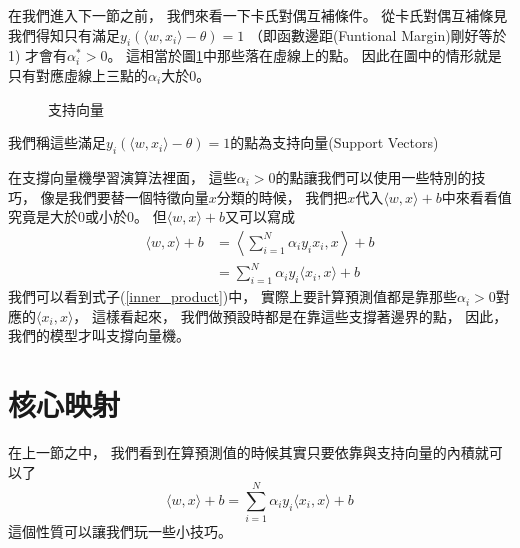   在我們進入下一節之前，
  我們來看一下卡氏對偶互補條件。
  從卡氏對偶互補條見我們得知只有滿足$y_i ( \langle w, x_i \rangle - \theta) = 1$
  （即函數邊距(Funtional Margin)剛好等於1)
  才會有$\alpha_i^{*} > 0$。
  這相當於圖\ref{fig:support_vectors}中那些落在虛線上的點。
  因此在圖中的情形就是只有對應虛線上三點的$\alpha_i$大於0。
  \begin{figure}
    \begin{center}
    \end{center}
    \caption{支持向量}
    \label{fig:support_vectors}
  \end{figure}
  我們稱這些滿足$y_i ( \langle w, x_i \rangle - \theta) = 1$的點為支持向量(Support Vectors)

  在支撐向量機學習演算法裡面，
  這些$\alpha_i > 0$的點讓我們可以使用一些特別的技巧，
  像是我們要替一個特徵向量$x$分類的時候，
  我們把$x$代入$\langle w, x \rangle + b$中來看看值究竟是大於0或小於0。
  但$\langle w, x \rangle + b$又可以寫成
  \begin{equation}
    \begin{split}
      \langle w, x \rangle + b 
      &= \left\langle \sum_{i=1}^N \alpha_i y_i x_i, x \right\rangle + b \\
      &= \sum_{i=1}^N \alpha_i y_i \langle x_i, x \rangle + b \label{inner_product}
    \end{split}
  \end{equation}
  我們可以看到式子(\ref{inner_product})中，
  實際上要計算預測值都是靠那些$\alpha_i > 0$對應的$\langle x_i, x \rangle$，
  這樣看起來，
  我們做預設時都是在靠這些支撐著邊界的點，
  因此，
  我們的模型才叫支撐向量機。
  
\section{核心映射}
  在上一節之中，
  我們看到在算預測值的時候其實只要依靠與支持向量的內積就可以了
  \begin{equation}
    \langle w, x \rangle + b = \sum_{i=1}^N \alpha_i y_i \langle x_i, x \rangle + b \label{inner_product}
  \end{equation}
  這個性質可以讓我們玩一些小技巧。

